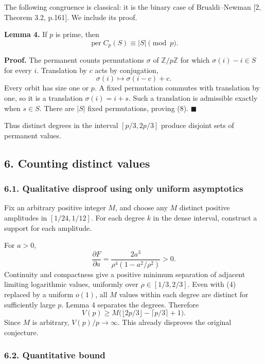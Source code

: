 \documentclass[
  11pt,
]{article}
\begin{document}
The following congruence is classical: it is the binary case of
Brualdi--Newman {[}2, Theorem 3.2, p.161{]}. We include its proof.

\textbf{Lemma 4.} If \(p\) is prime, then \[
 \operatorname{per}C_p(S)\equiv |S|\pmod p.                 \tag{8}
\]

\textbf{Proof.} The permanent counts permutations \(\sigma\) of
\(\mathbb Z/p\mathbb Z\) for which \(\sigma(i)-i\in S\) for every \(i\).
Translation by \(c\) acts by conjugation, \[
 \sigma(i)\longmapsto\sigma(i-c)+c.
\] Every orbit has size one or \(p\). A fixed permutation commutes with
translation by one, so it is a translation \(\sigma(i)=i+s\). Such a
translation is admissible exactly when \(s\in S\). There are \(|S|\)
fixed permutations, proving (8). \(\blacksquare\)

Thus distinct degrees in the interval \([p/3,2p/3]\) produce disjoint
sets of permanent values.

\subsection{6. Counting distinct values}\label{counting-distinct-values}

\subsubsection{6.1. Qualitative disproof using only uniform
asymptotics}\label{qualitative-disproof-using-only-uniform-asymptotics}

Fix an arbitrary positive integer \(M\), and choose any \(M\) distinct
positive amplitudes in \([1/24,1/12]\). For each degree \(k\) in the
dense interval, construct a support for each amplitude.

For \(a>0\), \[
 \frac{\partial F}{\partial a}
 =\frac{2a^3}{\rho^4(1-a^2/\rho^2)}>0.                    \tag{9}
\] Continuity and compactness give a positive minimum separation of
adjacent limiting logarithmic values, uniformly over
\(\rho\in[1/3,2/3]\). Even with (4) replaced by a uniform \(o(1)\), all
\(M\) values within each degree are distinct for sufficiently large
\(p\). Lemma 4 separates the degrees. Therefore \[
 V(p)\ge M\bigl(\lfloor2p/3\rfloor-\lceil p/3\rceil+1\bigr).
\] Since \(M\) is arbitrary, \(V(p)/p\to\infty\). This already disproves
the original conjecture.

\subsubsection{6.2. Quantitative bound}\label{quantitative-bound}
\end{document}
